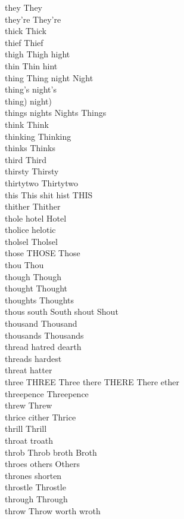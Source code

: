 they They\\
they're They're\\
thick Thick\\
thief Thief\\
thigh Thigh hight\\
thin Thin hint\\
thing Thing night Night\\
thing's night's\\
thing) night)\\
things nights Nights Things\\
think Think\\
thinking Thinking\\
thinks Thinks\\
third Third\\
thirsty Thirsty\\
thirtytwo Thirtytwo\\
this This shit hist THIS\\
thither Thither\\
thole hotel Hotel\\
tholice helotic\\
tholsel Tholsel\\
those THOSE Those\\
thou Thou\\
though Though\\
thought Thought\\
thoughts Thoughts\\
thous south South shout Shout\\
thousand Thousand\\
thousands Thousands\\
thread hatred dearth\\
threads hardest\\
threat hatter\\
three THREE Three there THERE There ether\\
threepence Threepence\\
threw Threw\\
thrice cither Thrice\\
thrill Thrill\\
throat troath\\
throb Throb broth Broth\\
throes others Others\\
thrones shorten\\
throstle Throstle\\
through Through\\
throw Throw worth wroth\\
